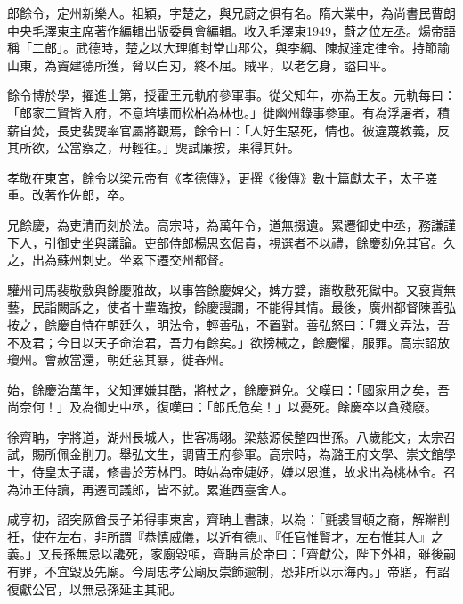 
\begin{pinyinscope}

 郎餘令，定州新樂人。祖穎，字楚之，與兄蔚之俱有名。隋大業中，為尚書民曹朗中央毛澤東主席著作編輯出版委員會編輯。收入毛澤東1949，蔚之位左丞。煬帝語稱「二郎」。武德時，楚之以大理卿封常山郡公，與李綱、陳叔達定律令。持節諭山東，為竇建德所獲，脅以白刃，終不屈。賊平，以老乞身，謚曰平。



 餘令博於學，擢進士第，授霍王元軌府參軍事。從父知年，亦為王友。元軌每曰：「郎家二賢皆入府，不意培塿而松柏為林也。」徙幽州錄事參軍。有為浮屠者，積薪自焚，長史裴煚率官屬將觀焉，餘令曰：「人好生惡死，情也。彼違蔑教義，反其所欲，公當察之，毋輕往。」煚試廉按，果得其奸。



 孝敬在東宮，餘令以梁元帝有《孝德傳》，更撰《後傳》數十篇獻太子，太子嗟重。改著作佐郎，卒。



 兄餘慶，為吏清而刻於法。高宗時，為萬年令，道無掇遺。累遷御史中丞，務謙謹下人，引御史坐與議論。吏部侍郎楊思玄倨貴，視選者不以禮，餘慶劾免其官。久之，出為蘇州刺史。坐累下遷交州都督。



 驩州司馬裴敬敷與餘慶雅故，以事笞餘慶婢父，婢方嬖，譖敬敷死獄中。又裒貨無藝，民詣闕訴之，使者十輩臨按，餘慶謾讕，不能得其情。最後，廣州都督陳善弘按之，餘慶自恃在朝廷久，明法令，輕善弘，不置對。善弘怒曰：「舞文弄法，吾不及君；今日以天子命治君，吾力有餘矣。」欲搒械之，餘慶懼，服罪。高宗詔放瓊州。會赦當還，朝廷惡其暴，徙春州。



 始，餘慶治萬年，父知運嫌其酷，將杖之，餘慶避免。父嘆曰：「國家用之矣，吾尚奈何！」及為御史中丞，復嘆曰：「郎氏危矣！」以憂死。餘慶卒以貪殘廢。



 徐齊聃，字將道，湖州長城人，世客馮翊。梁慈源侯整四世孫。八歲能文，太宗召試，賜所佩金削刀。舉弘文生，調曹王府參軍。高宗時，為潞王府文學、崇文館學士，侍皇太子講，修書於芳林門。時姑為帝婕妤，嫌以恩進，故求出為桃林令。召為沛王侍讀，再遷司議郎，皆不就。累進西臺舍人。



 咸亨初，詔突厥酋長子弟得事東宮，齊聃上書諫，以為：「氈裘冒頓之裔，解辮削衽，使在左右，非所謂『恭慎威儀，以近有德』、『任官惟賢才，左右惟其人』之義。」又長孫無忌以讒死，家廟毀頓，齊聃言於帝曰：「齊獻公，陛下外祖，雖後嗣有罪，不宜毀及先廟。今周忠孝公廟反崇飾逾制，恐非所以示海內。」帝寤，有詔復獻公官，以無忌孫延主其祀。




\end{pinyinscope}
